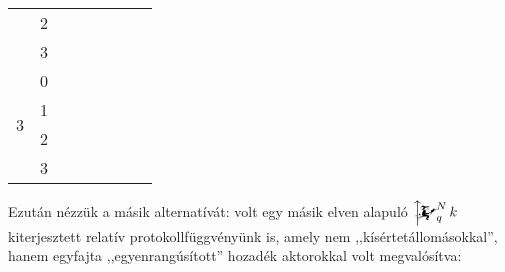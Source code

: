 \documentclass{article}
\newcommand{\blk}{\cellcolor{darkgray}}
\newcommand{\red}{\cellcolor{red!33}}
\newcommand{\grn}{\cellcolor{green!33}}
\newcommand{\ylw}{\cellcolor{yellow}}
\newcommand{\nothing}{\text{\raisebox{0.4em}{\rotatebox{180}{$\curvearrowleft$}}}}%
\newcommand{\just}[1]{\boxed{#1}}%
\newcommand{\incl}{\mathbf{incl}}
\newcommand{\excl}{\mathbf{excl}}
\newcommand{\mainfunext}[3]{\left\uparrow\!\!\!\mathwitch*_{#2}^{#1}#3\right.}
\begin{document}
\begin{table}[H]
\begin{tabular}{c|c|c|c|c|c|c|c|}
				               &  2                        &    \blk           & \blk           & \red\just\excl & \grn\just\incl & \blk           & \blk           \\\cline{2-8}
				               &  3                        &    \ylw           & \ylw           & \ylw\nothing   & \ylw\nothing   & \ylw           & \ylw           \\\hline\hline
			\multirow{4}{*}{3}     &  0                        &    \blk           & \blk           & \blk           & \blk           & \blk           & \blk           \\\cline{2-8}
				               &  1                        &    \ylw           & \ylw           & \ylw           & \ylw           & \ylw           & \ylw           \\\cline{2-8}
				               &  2                        &    \blk           & \blk           & \blk           & \blk           & \blk           & \blk           \\\cline{2-8}
				               &  3                        &    \ylw           & \ylw           & \ylw           & \ylw           & \ylw           & \ylw           \\\hline
		\end{tabular}
	\end{table}

	Ezután nézzük a másik alternatívát: volt egy másik elven alapuló $\mainfunext Nqk$ kiterjesztett relatív protokollfüggvényünk is, amely nem ,,kísértetállomásokkal'', hanem egyfajta ,,egyenrangúsított'' hozadék aktorokkal volt megvalósítva:
	 
\end{document}
